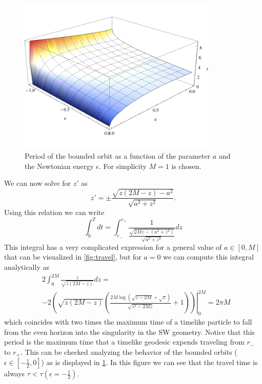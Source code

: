  \begin{figure}[hpt!]
\begin{center}
 \centerline{\includegraphics[width=0.85\textwidth]{img/Chapter3/travel2.png}}
 \end{center}
 \caption{Period of the bounded orbit as a function of the parameter $a$ and the Newtonian energy $\epsilon$. For simplicity $M=1$ is chosen.}
 \label{fig:travelother}
\end{figure} 
We can now solve for $z'$ as
\begin{equation}
 z'= \pm \frac{\sqrt{z (2 M-z)-a^2}}{\sqrt{a^2+z^2}}.
\end{equation}
Using this relation we can write
\begin{equation}
 \int_0^T dt = \int_{r_-}^{r_+} \frac{1}{\frac{\sqrt{2 M z-\left(a^2+z^2\right)}}{\sqrt{a^2+z^2}}} dz
\end{equation}
This integral has a very complicated expression for a general value of $a\in[0,M]$ that can be visualized in \cref{fig:travel}, but for $a=0$ we can compute this integral analytically as
\begin{equation}
\begin{aligned}
&2\int_{0}^{2M} \frac{z}{\sqrt{z (2 M-z)}} dz = \nonumber \\
& \left. -2\left( \sqrt{z (2 M-z)} \left(\frac{2 M \log \left(\sqrt{z-2 M}+\sqrt{z}\right)}{ \sqrt{z^2-2 M z}}+1\right) \right) \right|_{0}^{2M} = 2\pi M
 \end{aligned}
\end{equation}
which coincides with two times the maximum time of a timelike particle to fall from the even horizon into the singularity in the \gls{SW} geometry. Notice that this period is the maximum time that a timelike geodesic expends traveling from $r_-$ to $r_+$. This can be checked analyzing the behavior of the bounded orbits ($\epsilon \in [-\frac{1}{2},0]$) as is displayed in \cref{fig:travelother}. In this figure we can see that the travel time is always $\tau<\tau(\epsilon=-\frac{1}{2})$.

